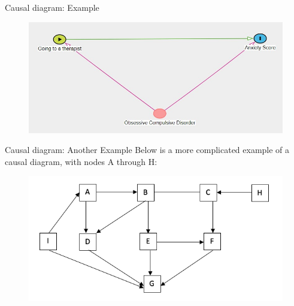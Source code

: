 \documentclass[10pt,t]{beamer}
\begin{document}
\begin{frame}{Causal diagram: Example}
	\begin{figure}
		\centering
		\includegraphics[scale = 0.45]{figures/therapy_dag}
	\end{figure}
\end{frame}

\begin{frame}{Causal diagram: Another Example}
Below is a more complicated example of a causal diagram, with nodes A through H:

\vspace{0.1cm}
\begin{figure}
	\centering \includegraphics[scale=0.4]{figures/dag1.png}
\end{figure}

\end{frame}
\end{document}
